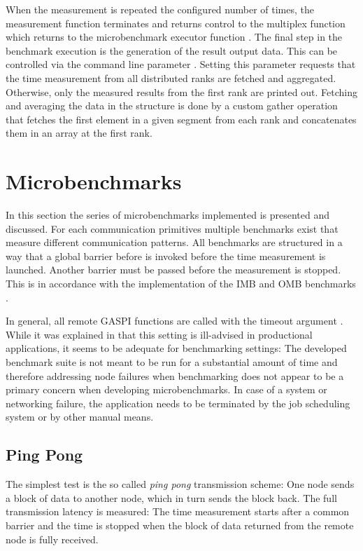 When the measurement is repeated the configured number of times, the measurement function terminates and returns control to the multiplex function which returns to the microbenchmark executor function \microbenchmarkExecute. The final step in the benchmark execution is the generation of the result output data. This can be controlled via the command line parameter . Setting this parameter requests that the time measurement from all distributed ranks are fetched and aggregated. Otherwise, only the measured results from the first rank are printed out. Fetching and averaging the data in the \ubenchResult structure is done by a custom gather operation that fetches the first element in a given segment from each rank and concatenates them in an array at the first rank.

\section{Microbenchmarks}

In this section the series of microbenchmarks implemented is presented and discussed. For each communication primitives multiple benchmarks exist that measure different communication patterns. All benchmarks are structured in a way that a global barrier before is invoked before the time measurement is launched. Another barrier must be passed before the measurement is stopped. This is in accordance with the implementation of the \ac{IMB} and \ac{OMB} benchmarks \cite{imb,omb}.

In general, all remote \ac{GASPI} functions are called with the timeout argument . While it was explained in  that this setting is ill-advised in productional applications, it seems to be adequate for benchmarking settings: The developed benchmark suite is not meant to be run for a substantial amount of time and therefore addressing node failures when benchmarking does not appear to be a primary concern when developing microbenchmarks. In case of a system or networking failure, the application needs to be terminated by the job scheduling system or by other manual means.

\subsection{Ping Pong}
\label{ssec:impl:ubench:ping-pong}

The simplest test is the so called \emph{ping pong} transmission scheme: One node sends a block of data to another node, which in turn sends the block back. The full transmission latency is measured: The time measurement starts after a common barrier and the time is stopped when the block of data returned from the remote node is fully received.

